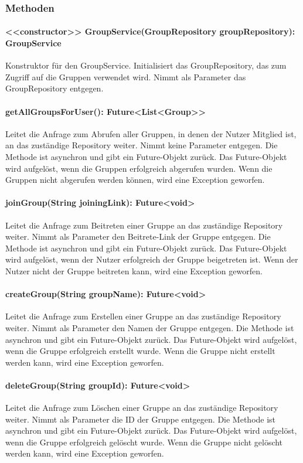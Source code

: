 \documentclass[parskip=full]{scrartcl}
\begin{document}
\subsubsection*{Methoden}
\paragraph{<<constructor>> GroupService(GroupRepository groupRepository): GroupService}
Konstruktor für den GroupService. Initialisiert das GroupRepository, das zum Zugriff auf die Gruppen verwendet wird. Nimmt als Parameter das GroupRepository entgegen.
\paragraph{getAllGroupsForUser(): Future<List<Group>>}
Leitet die Anfrage zum Abrufen aller Gruppen, in denen der Nutzer Mitglied ist, an das zuständige Repository weiter. Nimmt keine Parameter entgegen. Die Methode ist asynchron und gibt ein Future-Objekt zurück. Das Future-Objekt wird aufgelöst, wenn die Gruppen erfolgreich abgerufen wurden. Wenn die Gruppen nicht abgerufen werden können, wird eine Exception geworfen.
\paragraph{joinGroup(String joiningLink): Future<void>}
Leitet die Anfrage zum Beitreten einer Gruppe an das zuständige Repository weiter. Nimmt als Parameter den Beitrete-Link der Gruppe entgegen. Die Methode ist asynchron und gibt ein Future-Objekt zurück. Das Future-Objekt wird aufgelöst, wenn der Nutzer erfolgreich der Gruppe beigetreten ist. Wenn der Nutzer nicht der Gruppe beitreten kann, wird eine Exception geworfen.
\paragraph{createGroup(String groupName): Future<void>}
Leitet die Anfrage zum Erstellen einer Gruppe an das zuständige Repository weiter. Nimmt als Parameter den Namen der Gruppe entgegen. Die Methode ist asynchron und gibt ein Future-Objekt zurück. Das Future-Objekt wird aufgelöst, wenn die Gruppe erfolgreich erstellt wurde. Wenn die Gruppe nicht erstellt werden kann, wird eine Exception geworfen.
\paragraph{deleteGroup(String groupId): Future<void>}
Leitet die Anfrage zum Löschen einer Gruppe an das zuständige Repository weiter. Nimmt als Parameter die ID der Gruppe entgegen. Die Methode ist asynchron und gibt ein Future-Objekt zurück. Das Future-Objekt wird aufgelöst, wenn die Gruppe erfolgreich gelöscht wurde. Wenn die Gruppe nicht gelöscht werden kann, wird eine Exception geworfen.
\end{document}

